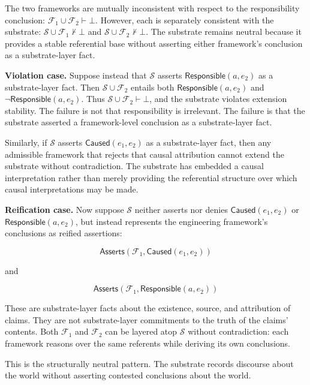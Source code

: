 \begin{example}
  \medskip
  The two frameworks are mutually inconsistent with respect to
  the responsibility conclusion:
  $\mathcal{F}_1 \cup \mathcal{F}_2 \vdash \bot$.
  However, each is separately consistent with the substrate:
  $\mathcal{S} \cup \mathcal{F}_1 \not\vdash \bot$
  and
  $\mathcal{S} \cup \mathcal{F}_2 \not\vdash \bot$.
  The substrate remains neutral because it provides a stable referential base
  without asserting either framework's conclusion as a substrate-layer fact.

  \medskip
  \noindent
  \textbf{Violation case.}
  Suppose instead that $\mathcal{S}$ asserts
  $\mathsf{Responsible}(a,e_2)$
  as a substrate-layer fact.
  Then $\mathcal{S} \cup \mathcal{F}_2$
  entails both
  $\mathsf{Responsible}(a,e_2)$
  and
  $\neg\mathsf{Responsible}(a,e_2)$.
  Thus
  $\mathcal{S} \cup \mathcal{F}_2 \vdash \bot$,
  and the substrate violates extension stability.
  The failure is not that responsibility is irrelevant.
  The failure is that the substrate asserted a framework-level conclusion
  as a substrate-layer fact.

  Similarly, if $\mathcal{S}$ asserts
  $\mathsf{Caused}(e_1,e_2)$
  as a substrate-layer fact,
  then any admissible framework that rejects that causal attribution
  cannot extend the substrate without contradiction.
  The substrate has embedded a causal interpretation
  rather than merely providing the referential structure
  over which causal interpretations may be made.

  \medskip
  \noindent
  \textbf{Reification case.}
  Now suppose $\mathcal{S}$ neither asserts nor denies
  $\mathsf{Caused}(e_1,e_2)$
  or
  $\mathsf{Responsible}(a,e_2)$,
  but instead represents the engineering framework's conclusions
  as reified assertions:

  \[
    \mathsf{Asserts}(\mathcal{F}_1, \mathsf{Caused}(e_1,e_2))
  \]

  and

  \[
    \mathsf{Asserts}(\mathcal{F}_1, \mathsf{Responsible}(a,e_2))
  \]

  These are substrate-layer facts about the existence,
  source, and attribution of claims.
  They are not substrate-layer commitments to the truth
  of the claims' contents.
  Both $\mathcal{F}_1$ and $\mathcal{F}_2$
  can be layered atop $\mathcal{S}$ without contradiction:
  each framework reasons over the same referents
  while deriving its own conclusions.

  This is the structurally neutral pattern.
  The substrate records discourse about the world
  without asserting contested conclusions about the world.
\end{example}

